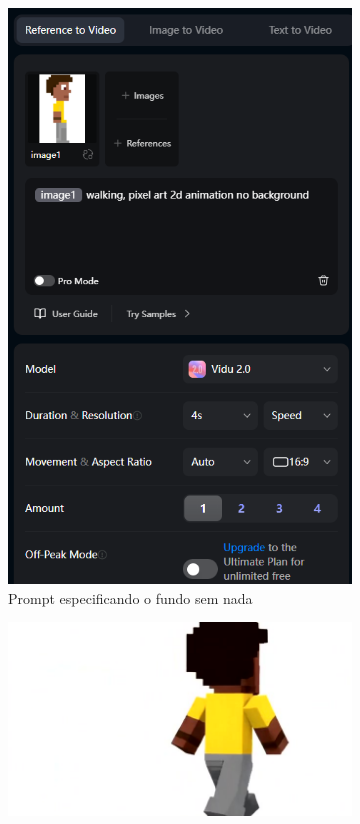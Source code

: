 \begin{figure}[htbp]
    \centering
    \caption{\small Processo da utilização 4 do Vidu em julho/2025}
    \label{fig:vidu5}
    \begin{subfigure}{0.4\linewidth}
        \includegraphics[width=1\linewidth]{figs/vidu/tela5_2.PNG}
        \caption{\small Prompt especificando o fundo sem nada}
        \label{fig:vidu5a}
    \end{subfigure}
    \begin{subfigure}{0.4\linewidth}
        \includegraphics[width=1\linewidth]{figs/vidu/frame6_2.jpg}

\end{subfigure}
\end{figure}
